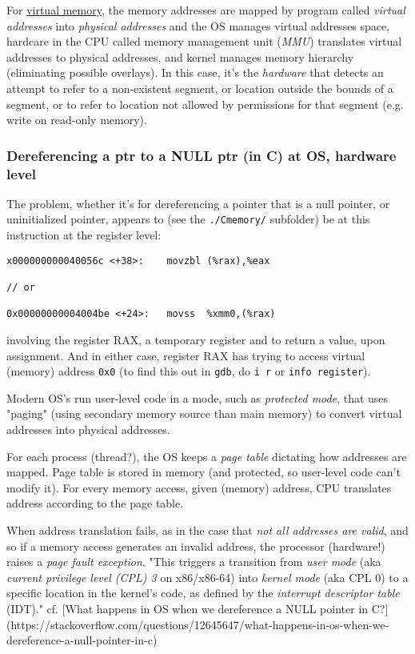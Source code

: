 \documentclass[10pt]{amsart}
\begin{document}
\begin{multicols*}{2}
For \href{https://en.wikipedia.org/wiki/Virtual_memory}{virtual memory}, the memory addresses are mapped by program called \emph{virtual addresses} into \emph{physical addresses} and the OS manages virtual addresses space, hardcare in the CPU called memory management unit (\emph{MMU}) translates virtual addresses to physical addresses, and kernel manages memory hierarchy (eliminating possible overlays).  In this case, it's the \emph{hardware} that detects an attempt to refer to a non-existent segment, or location outside the bounds of a segment, or to refer to location not allowed by permissions for that segment (e.g. write on read-only memory).   

\subsubsection{Dereferencing a ptr to a NULL ptr (in C) at OS, hardware level}


The problem, whether it's for dereferencing a pointer that is a null pointer, or uninitialized pointer, appears to (see the \verb|./Cmemory/| subfolder) be at this instruction at the register level:  

\begin{lstlisting}
x000000000040056c <+38>:	movzbl (%rax),%eax

// or 

0x00000000004004be <+24>:	movss  %xmm0,(%rax)  
\end{lstlisting}

involving the register RAX, a temporary register and to return a value, upon assignment.  And in either case, register RAX has trying to access virtual (memory) address \verb|0x0| (to find this out in \verb|gdb|, do \verb|i r| or \verb|info register|).  

Modern OS's run user-level code in a mode, such as \emph{protected mode}, that uses "paging" (using secondary memory source than main memory) to convert virtual addresses into physical addresses.  

For each process (thread?), the OS keeps a \emph{page table} dictating how addresses are mapped.  Page table is stored in memory (and protected, so user-level code can't modify it).  For every memory access, given (memory) address, CPU translates address according to the page table.  

When address translation fails, as in the case that \emph{not all addresses are valid}, and so if a memory access generates an invalid address, the processor (hardware!) raises a \emph{page fault exception}.  "This triggers a transition from \emph{user mode} (aka \emph{current privilege level (CPL) 3} on x86/x86-64) into \emph{kernel mode} (aka CPL 0) to a specific location in the kernel's code, as defined by the \emph{interrupt descriptor table} (IDT)."  cf. [What happens in OS when we dereference a NULL pointer in C?](https://stackoverflow.com/questions/12645647/what-happens-in-os-when-we-dereference-a-null-pointer-in-c)



\end{multicols*}
\end{document}
